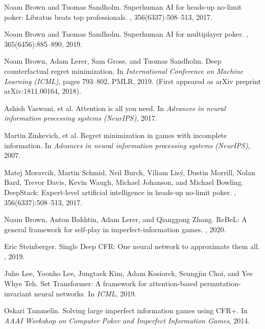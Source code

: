 \documentclass[11pt,a4paper]{article}
\begin{document}

\begin{thebibliography}{99}

Noam Brown and Tuomas Sandholm.
\newblock Superhuman AI for heads-up no-limit poker: Libratus beats top professionals.
, 356(6337):508--513, 2017.

Noam Brown and Tuomas Sandholm.
\newblock Superhuman AI for multiplayer poker.
, 365(6456):885--890, 2019.

Noam Brown, Adam Lerer, Sam Gross, and Tuomas Sandholm.
\newblock Deep counterfactual regret minimization.
\newblock In {\em International Conference on Machine Learning (ICML)}, pages 793--802. PMLR, 2019. (First appeared as arXiv preprint arXiv:1811.00164, 2018).

Ashish Vaswani, et al.
\newblock Attention is all you need.
\newblock In {\em Advances in neural information processing systems (NeurIPS)}, 2017.

Martin Zinkevich, et al.
\newblock Regret minimization in games with incomplete information.
\newblock In {\em Advances in neural information processing systems (NeurIPS)}, 2007.

Matej Moravcik, Martin Schmid, Neil Burch, Viliam Lisý, Dustin Morrill, Nolan Bard, Trevor Davis, Kevin Waugh, Michael Johanson, and Michael Bowling.
\newblock DeepStack: Expert-level artificial intelligence in heads-up no-limit poker.
, 356(6337):508--513, 2017.

Noam Brown, Anton Bakhtin, Adam Lerer, and Qianggong Zhang.
\newblock ReBeL: A general framework for self-play in imperfect-information games.
, 2020.

Eric Steinberger.
\newblock Single Deep CFR: One neural network to approximate them all.
, 2019.

Juho Lee, Yoonho Lee, Jungtaek Kim, Adam Kosiorek, Seungjin Choi, and Yee Whye Teh.
\newblock Set Transformer: A framework for attention-based permutation-invariant neural networks.
\newblock In {\em ICML}, 2019.

Oskari Tammelin.
\newblock Solving large imperfect information games using CFR+.
\newblock In {\em AAAI Workshop on Computer Poker and Imperfect Information Games}, 2014.


\end{thebibliography}
\end{document}
